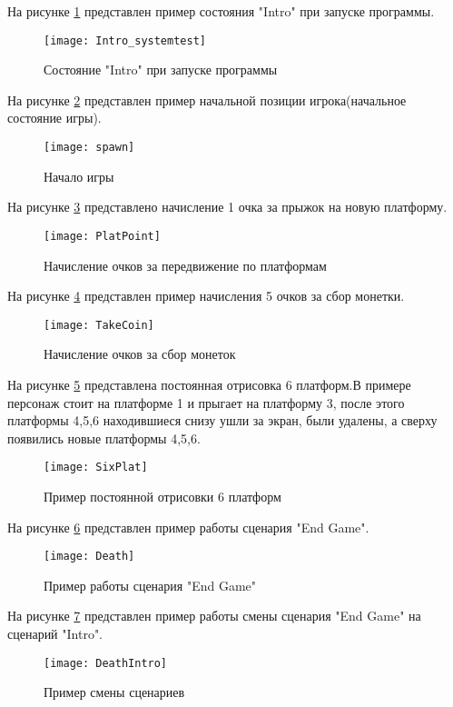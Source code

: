 На рисунке \ref{Intro_systemtest:image} представлен пример состояния "Intro" при запуске программы.
\begin{figure}[H]
	\centering
	\texttt{[image: Intro\_systemtest]}
	\caption{Состояние "Intro" при запуске программы}
	\label{Intro_systemtest:image}
\end{figure}

На рисунке \ref{spawn:image} представлен пример начальной позиции игрока(начальное состояние игры).
\begin{figure}[H]
	\centering
	\texttt{[image: spawn]}
	\caption{Начало игры}
	\label{spawn:image}
\end{figure}

На рисунке \ref{PlatPoint:image} представлено начисление 1 очка за прыжок на новую платформу.
\begin{figure}[H]
	\centering
	\texttt{[image: PlatPoint]}
	\caption{Начисление очков за передвижение по платформам}
	\label{PlatPoint:image}
\end{figure}

На рисунке \ref{TakeCoin:image} представлен пример начисления 5 очков за сбор монетки.
\begin{figure}[H]
	\centering
	\texttt{[image: TakeCoin]}
	\caption{Начисление очков за сбор монеток}
	\label{TakeCoin:image}
\end{figure}

На рисунке \ref{SixPlat:image} представлена постоянная отрисовка 6 платформ.В примере персонаж стоит на платформе 1 и прыгает на платформу 3, после этого платформы 4,5,6 находившиеся снизу ушли за экран, были удалены, а сверху появились новые платформы 4,5,6.
\begin{figure}[H]
	\centering
	\texttt{[image: SixPlat]}
	\caption{Пример постоянной отрисовки 6 платформ}
	\label{SixPlat:image}
\end{figure}

На рисунке \ref{Death:image} представлен пример работы сценария "End Game".
\begin{figure}[H]
	\centering
	\texttt{[image: Death]}
	\caption{Пример работы сценария "End Game"}
	\label{Death:image}
\end{figure}

На рисунке \ref{DeathIntro:image} представлен пример работы смены сценария "End Game" на сценарий "Intro".
\begin{figure}[H]
	\centering
	\texttt{[image: DeathIntro]}
	\caption{Пример смены сценариев}
	\label{DeathIntro:image}
\end{figure}


